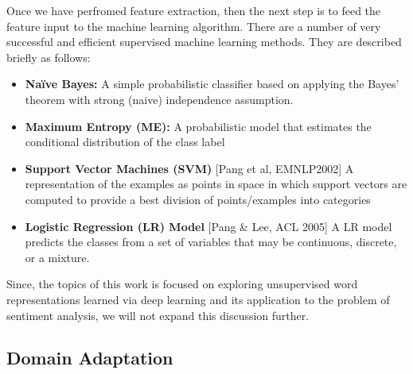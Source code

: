 Once we have perfromed feature extraction, then the next step is to feed the feature input to the machine learning algorithm. There are a number of very successful and efficient supervised machine learning methods. They are described briefly as follows:
\begin{itemize}
\item \textbf{Na\"{i}ve Bayes:} A simple probabilistic classifier based on applying the Bayes' theorem with strong (naive) independence assumption.
\item \textbf{Maximum Entropy (ME):}  A probabilistic model that estimates the conditional distribution of the class label
\item \textbf{Support Vector Machines (SVM)} [Pang et al, EMNLP2002] A representation of the examples as points in space in which support vectors are computed to provide a best division of points/examples into categories
\item \textbf{Logistic Regression (LR) Model} [Pang \& Lee, ACL 2005] A LR model predicts the classes from a set of variables that may be continuous, discrete, or a mixture.
\end{itemize}

Since, the topics of this work is focused on exploring unsupervised word representations learned via deep learning and its application to the problem of sentiment analysis, we will not expand this discussion further.
\subsection{Domain Adaptation}
